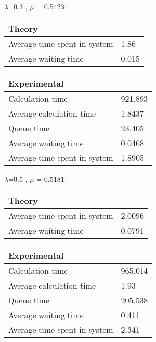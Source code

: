 \begin{minipage}{\linewidth}
   $\lambda$=0.3 , $\mu$ = 0.5423:

    \bigskip
    \begin{minipage}{0.45\linewidth}
        \begin{tabular}{|l|l|}
            \hline
            Theory & \\
            \hline
            Average time spent in system & 1.86 \\
            Average waiting time & 0.015 \\
            \hline
        \end{tabular}
    \end{minipage}
    \begin{minipage}{0.45\linewidth}
        \begin{tabular}{|l|l|}
            \hline
            Experimental & \\
            \hline
            Calculation time & 921.893 \\
            Average calculation time & 1.8437 \\
            Queue time & 23.405 \\
            Average waiting time & 0.0468  \\
            Average time spent in system & 1.8905 \\
            \hline
        \end{tabular}
    \end{minipage}
    \bigskip
\end{minipage}

\begin{minipage}{\linewidth}
   $\lambda$=0.5 , $\mu$ = 0.5181:

    \bigskip
    \begin{minipage}{0.45\linewidth}
        \begin{tabular}{|l|l|}
            \hline
            Theory & \\
            \hline
            Average time spent in system & 2.0096 \\
            Average waiting time & 0.0791 \\
            \hline
        \end{tabular}
    \end{minipage}
    \begin{minipage}{0.45\linewidth}
        \begin{tabular}{|l|l|}
            \hline
            Experimental & \\
            \hline
            Calculation time & 965.014 \\
            Average calculation time & 1.93 \\
            Queue time & 205.538 \\
            Average waiting time & 0.411 \\
            Average time spent in system & 2.341 \\
            \hline
        \end{tabular}
    \end{minipage}
    \bigskip
\end{minipage}

